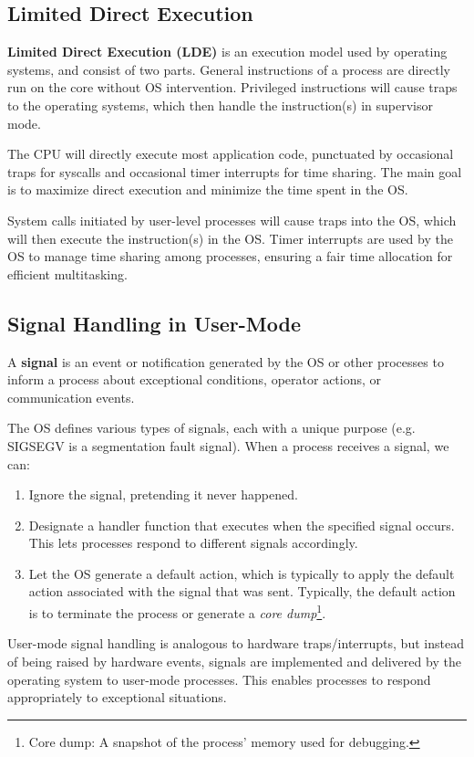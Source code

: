 \documentclass{report}
\newcommand{\definitionBegin}[1]{\begin{tcolorbox}[title={Definition: #1}]}
\newcommand{\definitionEnd}{\end{tcolorbox}}
\begin{document}
\subsection{Limited Direct Execution}
\definitionBegin{Limited Direct Execution (LDE)}
\textbf{Limited Direct Execution (LDE)} is an execution model used by operating systems, and consist
of two parts. General instructions of a process are directly run on the core without OS
intervention. Privileged instructions will cause traps to the operating systems, which then handle
the instruction(s) in supervisor mode.
\definitionEnd

The CPU will directly execute most application code, punctuated by occasional traps for syscalls and
occasional timer interrupts for time sharing. The main goal is to maximize direct execution and
minimize the time spent in the OS.

System calls initiated by user-level processes will cause traps into the OS, which will then execute
the instruction(s) in the OS. Timer interrupts are used by the OS to manage time sharing among
processes, ensuring a fair time allocation for efficient multitasking.


\subsection{Signal Handling in User-Mode}
\definitionBegin{Signal}
A \textbf{signal} is an event or notification generated by the OS or other processes to inform a
process about exceptional conditions, operator actions, or communication events.
\definitionEnd

The OS defines various types of signals, each with a unique purpose (e.g. SIGSEGV is a segmentation
fault signal). When a process receives a signal, we can:
\begin{enumerate}[label=\textit{(\roman*)}]
\item Ignore the signal, pretending it never happened.
\item Designate a handler function that executes when the specified signal occurs. This lets
  processes respond to different signals accordingly.
\item Let the OS generate a default action, which is typically to apply the default action associated
  with the signal that was sent. Typically, the default action is to terminate the process or
  generate a \textit{core dump}\footnote{Core dump: A snapshot of the process' memory used for
    debugging.}. 
\end{enumerate}
User-mode signal handling is analogous to hardware traps/interrupts, but instead of being raised by
hardware events, signals are implemented and delivered by the operating system to user-mode
processes. This enables processes to respond appropriately to exceptional situations.
\end{document}
